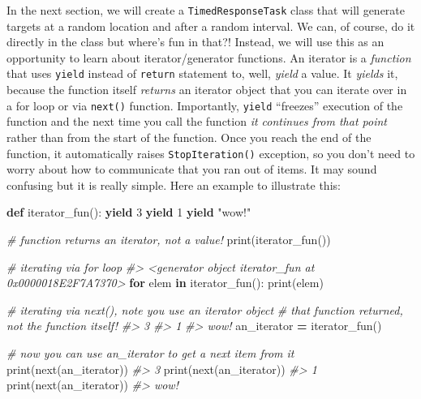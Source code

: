 \documentclass[
]{book}
\newenvironment{Shaded}{\begin{snugshade}}{\end{snugshade}}
\newcommand{\BuiltInTok}[1]{#1}
\newcommand{\CommentTok}[1]{\textcolor[rgb]{0.56,0.35,0.01}{\textit{#1}}}
\newcommand{\ControlFlowTok}[1]{\textcolor[rgb]{0.13,0.29,0.53}{\textbf{#1}}}
\newcommand{\DecValTok}[1]{\textcolor[rgb]{0.00,0.00,0.81}{#1}}
\newcommand{\KeywordTok}[1]{\textcolor[rgb]{0.13,0.29,0.53}{\textbf{#1}}}
\newcommand{\NormalTok}[1]{#1}
\newcommand{\OperatorTok}[1]{\textcolor[rgb]{0.81,0.36,0.00}{\textbf{#1}}}
\newcommand{\StringTok}[1]{\textcolor[rgb]{0.31,0.60,0.02}{#1}}
\begin{document}
In the next section, we will create a \texttt{TimedResponseTask} class that will generate targets at a random location and after a random interval. We can, of course, do it directly in the class but where's fun in that?! Instead, we will use this as an opportunity to learn about iterator/generator functions. An iterator is a \emph{function} that uses \texttt{yield} instead of \texttt{return} statement to, well, \emph{yield} a value. It \emph{yields} it, because the function itself \emph{returns} an iterator object that you can iterate over in a for loop or via \texttt{next()} function. Importantly, \texttt{yield} ``freezes'' execution of the function and the next time you call the function \emph{it continues from that point} rather than from the start of the function. Once you reach the end of the function, it automatically raises \texttt{StopIteration()} exception, so you don't need to worry about how to communicate that you ran out of items. It may sound confusing but it is really simple. Here an example to illustrate this:

\begin{Shaded}
\begin{Highlighting}[]
\KeywordTok{def}\NormalTok{ iterator\_fun():}
    \ControlFlowTok{yield} \DecValTok{3}
    \ControlFlowTok{yield} \DecValTok{1}
    \ControlFlowTok{yield} \StringTok{"wow!"}
  
\CommentTok{\# function returns an iterator, not a value!}
\BuiltInTok{print}\NormalTok{(iterator\_fun())}

\CommentTok{\# iterating via for loop}
\CommentTok{\#\textgreater{} \textless{}generator object iterator\_fun at 0x0000018E2F7A7370\textgreater{}}
\ControlFlowTok{for}\NormalTok{ elem }\KeywordTok{in}\NormalTok{ iterator\_fun():}
    \BuiltInTok{print}\NormalTok{(elem)}
    
\CommentTok{\# iterating via next(), note you use an iterator object }
\CommentTok{\# that function returned, not the function itself!}
\CommentTok{\#\textgreater{} 3}
\CommentTok{\#\textgreater{} 1}
\CommentTok{\#\textgreater{} wow!}
\NormalTok{an\_iterator }\OperatorTok{=}\NormalTok{ iterator\_fun()  }

\CommentTok{\# now you can use an\_iterator to get a next item from it}
\BuiltInTok{print}\NormalTok{(}\BuiltInTok{next}\NormalTok{(an\_iterator))}
\CommentTok{\#\textgreater{} 3}
\BuiltInTok{print}\NormalTok{(}\BuiltInTok{next}\NormalTok{(an\_iterator))}
\CommentTok{\#\textgreater{} 1}
\BuiltInTok{print}\NormalTok{(}\BuiltInTok{next}\NormalTok{(an\_iterator))}
\CommentTok{\#\textgreater{} wow!}
\end{Highlighting}
\end{Shaded}
\end{document}
